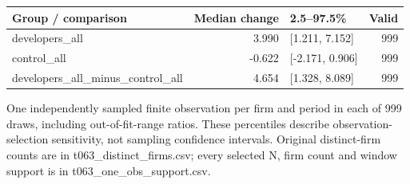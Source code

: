 \begingroup\small
\setlength{\tabcolsep}{3.5pt}
\begin{tabular}{lrlr}
\toprule
Group / comparison & Median change & 2.5--97.5\% & Valid \\
\midrule
developers\_all & 3.990 & [1.211, 7.152] & 999 \\
control\_all & -0.622 & [-2.171, 0.906] & 999 \\
developers\_all\_minus\_control\_all & 4.654 & [1.328, 8.089] & 999 \\
\bottomrule
\end{tabular}
\par\medskip
\footnotesize One independently sampled finite observation per firm and period in each of 999 draws, including out-of-fit-range ratios. These percentiles describe observation-selection sensitivity, not sampling confidence intervals. Original distinct-firm counts are in t063\_distinct\_firms.csv; every selected N, firm count and window support is in t063\_one\_obs\_support.csv.
\endgroup
